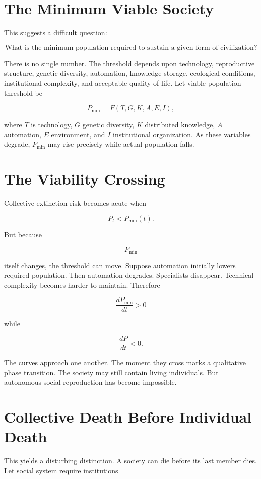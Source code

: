 \documentclass[11pt,oneside]{book}
\theoremstyle{definition}
\theoremstyle{remark}
\begin{document}
\section{The Minimum Viable Society}

This suggests a difficult question:

\[
\text{What is the minimum population required to sustain a given form of civilization?}
\]

There is no single number. The threshold depends upon technology, reproductive structure, genetic
diversity, automation, knowledge storage, ecological conditions, institutional complexity, and
acceptable quality of life. Let viable population threshold be

\[
P_{\min} = F(T,G,K,A,E,I),
\]

where \(T\) is technology, \(G\) genetic diversity, \(K\) distributed knowledge, \(A\) automation,
\(E\) environment, and \(I\) institutional organization. As these variables degrade, \(P_{\min}\)
may rise precisely while actual population falls.

\section{The Viability Crossing}

Collective extinction risk becomes acute when

\[
P_t<P_{\min}(t).
\]

But because

\[
P_{\min}
\]

itself changes, the threshold can move. Suppose automation initially lowers required population.
Then automation degrades. Specialists disappear. Technical complexity becomes harder to maintain.
Therefore

\[
\frac{dP_{\min}}{dt}>0
\]

while

\[
\frac{dP}{dt}<0.
\]

The curves approach one another. The moment they cross marks a qualitative phase transition. The
society may still contain living individuals. But autonomous social reproduction has become
impossible.

\section{Collective Death Before Individual Death}

This yields a disturbing distinction. A society can die before its last member dies. Let social
system require institutions
\end{document}
